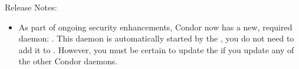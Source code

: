\noindent Release Notes:

\begin{itemize}

\item As part of ongoing security enhancements, Condor now has a
new, required daemon: .  This daemon is
automatically started by the , you do not need to
add it to .  
However, you must be certain to update the 
if you update any of the other Condor daemons.


\end{itemize}
